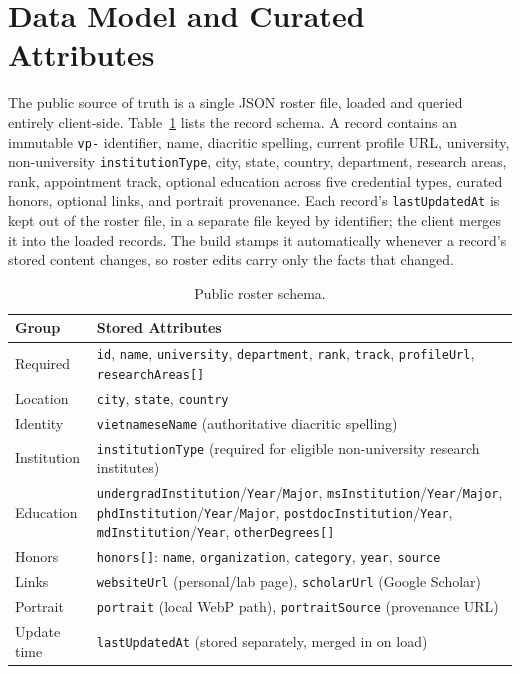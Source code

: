 \documentclass[11pt]{article}
\newcommand{\code}[1]{\texttt{\small #1}}
\begin{document}
\section{Data Model and Curated Attributes}
\label{sec:model}
The public source of truth is a single JSON roster file, loaded and queried entirely client-side. Table~\ref{tab:schema} lists the record schema.
A record contains an immutable \code{vp-} identifier, name, diacritic spelling, current profile URL, university, non-university \code{institutionType}, city, state, country, department, research areas, rank, appointment track, optional education across five credential types, curated honors, optional links, and portrait provenance.
Each record's \code{lastUpdatedAt} is kept out of the roster file, in a separate file keyed by identifier; the client merges it into the loaded records. The build stamps it automatically whenever a record's stored content changes, so roster edits carry only the facts that changed.

\begin{table}[t]
\centering
\caption{Public roster schema.}
\label{tab:schema}
\small
\begin{tabularx}{\linewidth}{@{}l>{\raggedright\arraybackslash}X@{}}
\toprule
Group & Stored Attributes \\
\midrule
Required & \code{id}, \code{name}, \code{university}, \code{department}, \code{rank}, \code{track}, \code{profileUrl}, \code{researchAreas[]} \\
Location & \code{city}, \code{state}, \code{country} \\
Identity & \code{vietnameseName} (authoritative diacritic spelling) \\
Institution & \code{institutionType} (required for eligible non-university research institutes) \\
Education & \code{undergradInstitution}/\code{Year}/\code{Major}, \code{msInstitution}/\code{Year}/\code{Major}, \code{phdInstitution}/\code{Year}/\code{Major}, \code{postdocInstitution}/\code{Year}, \code{mdInstitution}/\code{Year}, \code{otherDegrees[]} \\
Honors & \code{honors[]}: \code{name}, \code{organization}, \code{category}, \code{year}, \code{source} \\
Links & \code{websiteUrl} (personal/lab page), \code{scholarUrl} (Google Scholar) \\
Portrait & \code{portrait} (local WebP path), \code{portraitSource} (provenance URL) \\
Update time & \code{lastUpdatedAt} (stored separately, merged in on load) \\
\bottomrule
\end{tabularx}
\end{table}
\end{document}
